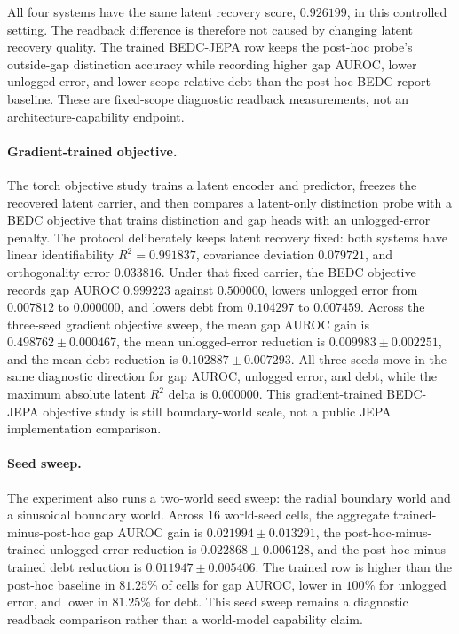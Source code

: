 All four systems have the same latent recovery score, $0.926199$, in this
controlled setting.  The readback difference is therefore not caused by changing
latent recovery quality.  The trained BEDC-JEPA row keeps the post-hoc probe's
outside-gap distinction accuracy while recording higher gap AUROC, lower
unlogged error, and lower scope-relative debt than the post-hoc BEDC report
baseline.  These are fixed-scope diagnostic readback measurements, not an
architecture-capability endpoint.

\paragraph{Gradient-trained objective.}
The torch objective study trains a latent encoder and predictor, freezes
the recovered latent carrier, and then compares a latent-only distinction
probe with a BEDC objective that trains distinction and gap heads with an
unlogged-error penalty.  The protocol deliberately keeps latent recovery fixed:
both systems have linear identifiability $R^2=0.991837$, covariance deviation
$0.079721$, and orthogonality error $0.033816$.  Under that fixed carrier, the
BEDC objective records gap AUROC $0.999223$ against $0.500000$, lowers
unlogged error from $0.007812$ to $0.000000$, and lowers debt from $0.104297$
to $0.007459$.  Across the three-seed gradient objective sweep, the mean gap
AUROC gain is $0.498762 \pm 0.000467$, the mean unlogged-error reduction is
$0.009983 \pm 0.002251$, and the mean debt reduction is
$0.102887 \pm 0.007293$.  All three seeds move in the same diagnostic direction
for gap AUROC, unlogged error, and debt, while the maximum absolute latent $R^2$ delta is
$0.000000$.  This gradient-trained BEDC-JEPA objective study is still
boundary-world scale, not a public JEPA implementation comparison.

\paragraph{Seed sweep.}
The experiment also runs a two-world seed sweep: the radial boundary world and
a sinusoidal boundary world.  Across $16$ world-seed cells, the aggregate
trained-minus-post-hoc gap AUROC gain is $0.021994 \pm 0.013291$, the
post-hoc-minus-trained unlogged-error reduction is $0.022868 \pm 0.006128$,
and the post-hoc-minus-trained debt reduction is $0.011947 \pm 0.005406$.
The trained row is higher than the post-hoc baseline in $81.25\%$ of cells for
gap AUROC, lower in $100\%$ for unlogged error, and lower in $81.25\%$ for debt.
This seed sweep remains a diagnostic readback comparison rather than a
world-model capability claim.

